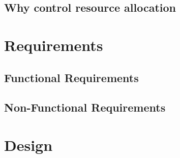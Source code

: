 \documentclass{l4proj}
\begin{document}
\subsection{Why control resource allocation}

\section{Requirements}
\subsection{Functional Requirements}
\subsection{Non-Functional Requirements}

\newpage
\section{Design}
\end{document}
